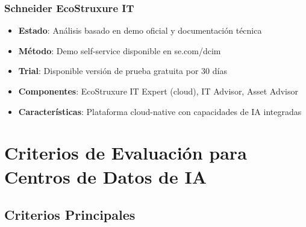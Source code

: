 \documentclass[12pt,a4paper]{article}
\begin{document}
\subsubsection{Schneider EcoStruxure IT}
\begin{itemize}
    \item \textbf{Estado}: Análisis basado en demo oficial y documentación técnica
    \item \textbf{Método}: Demo self-service disponible en se.com/dcim
    \item \textbf{Trial}: Disponible versión de prueba gratuita por 30 días
    \item \textbf{Componentes}: EcoStruxure IT Expert (cloud), IT Advisor, Asset Advisor
    \item \textbf{Características}: Plataforma cloud-native con capacidades de IA integradas
\end{itemize}

\section{Criterios de Evaluación para Centros de Datos de IA}

\subsection{Criterios Principales}
\end{document}
